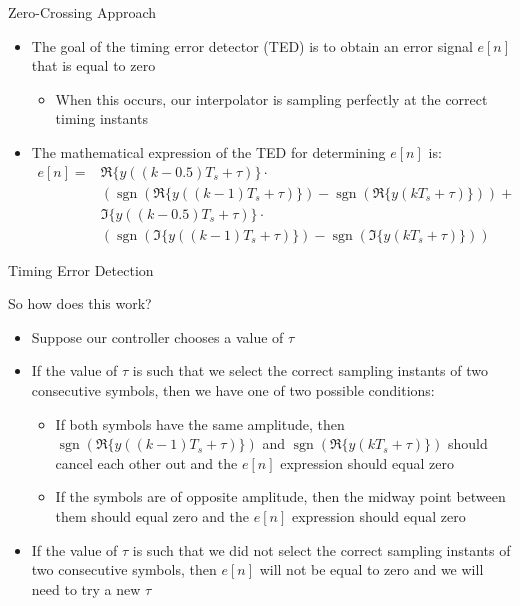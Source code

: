 \documentclass[10pt]{beamer}
\DeclareMathOperator{\sgn}{sgn}
\begin{document}

\begin{frame}[fragile]{Zero-Crossing Approach}

\begin{itemize}
 \item The goal of the timing error detector (TED) is to obtain an error signal $e[n]$ that is equal to zero
 \begin{itemize}
  \item When this occurs, our interpolator is sampling perfectly at the correct timing instants
 \end{itemize}
 \item The mathematical expression of the TED for determining $e[n]$ is:
 \begin{align}
  e[n]=&\Re\{y((k-0.5)T_s+\tau)\}\cdot\nonumber\\
  &(\sgn(\Re\{y((k-1)T_s+\tau)\})-\sgn(\Re\{y(kT_s+\tau)\}))+\nonumber\\
  &\Im\{y((k-0.5)T_s+\tau)\}\cdot\nonumber\\
  &(\sgn(\Im\{y((k-1)T_s+\tau)\})-\sgn(\Im\{y(kT_s+\tau)\}))
 \end{align}

\end{itemize}


\end{frame}


\begin{frame}[fragile]{Timing Error Detection}

So how does this work? 
\begin{itemize}
 \item Suppose our controller chooses a value of $\tau$
 \item If the value of $\tau$ is such that we select the correct sampling instants of two consecutive symbols, then we have one of two possible conditions:
 \begin{itemize}
  \item If both symbols have the same amplitude, then $\sgn(\Re\{y((k-1)T_s+\tau)\})$ and $\sgn(\Re\{y(kT_s+\tau)\})$ should cancel each other out and the $e[n]$ expression should equal zero
  \item If the symbols are of opposite amplitude, then the midway point between them should equal zero and the $e[n]$ expression should equal zero
 \end{itemize}
 \item If the value of $\tau$ is such that we did not select the correct sampling instants of two consecutive symbols, then $e[n]$ will not be equal to zero and we will need to try a new $\tau$
\end{itemize}



\end{frame}
\end{document}
